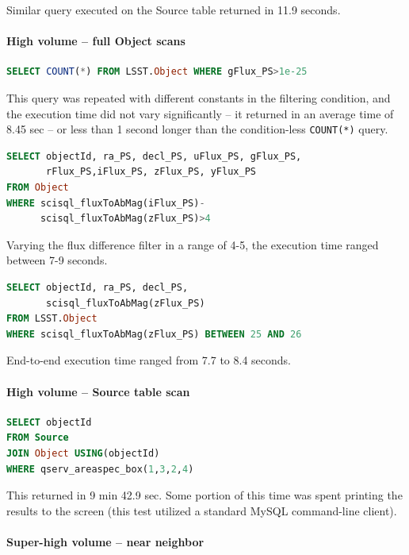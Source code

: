 \documentclass[DM,lsstdraft,toc]{lsstdoc}
\begin{document}
Similar query executed on the Source table returned in 11.9 seconds.

\paragraph{High volume -- full Object
scans}\label{high-volume-full-object-scans}

\begin{lstlisting}[language=SQL]
SELECT COUNT(*) FROM LSST.Object WHERE gFlux_PS>1e-25
\end{lstlisting}

This query was repeated with different constants in the filtering
condition, and the execution time did not vary significantly -- it
returned in an average time of 8.45 sec -- or less than 1 second longer
than the condition-less \texttt{COUNT(*)} query.

\begin{lstlisting}[language=SQL]
SELECT objectId, ra_PS, decl_PS, uFlux_PS, gFlux_PS,
       rFlux_PS,iFlux_PS, zFlux_PS, yFlux_PS
FROM Object
WHERE scisql_fluxToAbMag(iFlux_PS)-
      scisql_fluxToAbMag(zFlux_PS)>4
\end{lstlisting}

Varying the flux difference filter in a range of 4-5, the execution time
ranged between 7-9 seconds.

\begin{lstlisting}[language=SQL]
SELECT objectId, ra_PS, decl_PS,
       scisql_fluxToAbMag(zFlux_PS)
FROM LSST.Object
WHERE scisql_fluxToAbMag(zFlux_PS) BETWEEN 25 AND 26
\end{lstlisting}

End-to-end execution time ranged from 7.7 to 8.4 seconds.

\paragraph{High volume -- Source table
scan}\label{high-volume-source-table-scan}

\begin{lstlisting}[language=SQL]
SELECT objectId
FROM Source
JOIN Object USING(objectId)
WHERE qserv_areaspec_box(1,3,2,4)
\end{lstlisting}

This returned in 9 min 42.9 sec. Some portion of this time was spent
printing the results to the screen (this test utilized a standard MySQL
command-line client).

\paragraph{Super-high volume -- near
neighbor}\label{super-high-volume-near-neighbor}
\end{document}
